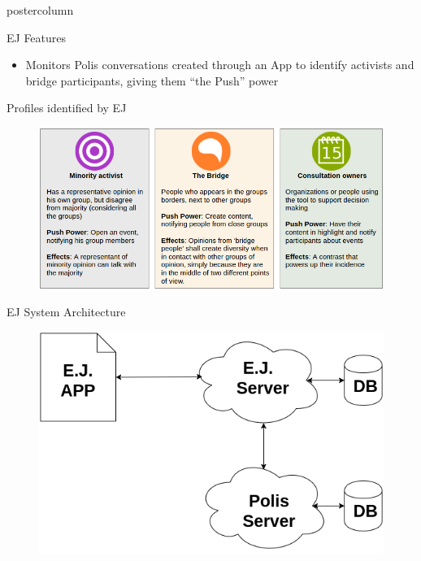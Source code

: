 \documentclass[final,hyperref={pdfpagelabels=false}]{beamer}
\begin{document}
\begin{frame}
\begin{columns}
\begin{column}{.49\textwidth}
\begin{beamercolorbox}[center,wd=\textwidth]{postercolumn}
\begin{minipage}[T]{.95\textwidth}
{\begin{block}{EJ Features}
\begin{itemize}
    \item Monitors Polis conversations created through an App
    to identify activists and bridge participants, giving them ``the Push''
    power
  \end{itemize}

\end{block}

\begin{block}{Profiles identified by EJ}
  \begin{figure}
    \begin{center}
      \includegraphics[width=\textwidth]{../images/userprofiles.png}
      \caption{}
      \label{fig:user-profiles}
    \end{center}
  \end{figure}
\end{block}

\begin{block}{EJ System Architecture}

  \begin{figure}
    \begin{center}
      \includegraphics[scale=1.3]{../images/polis4.png}
      \label{fig:architecture}
    \end{center}
  \end{figure}


\end{block}}
\end{minipage}
\end{beamercolorbox}
\end{column}
\end{columns}
\end{frame}
\end{document}
